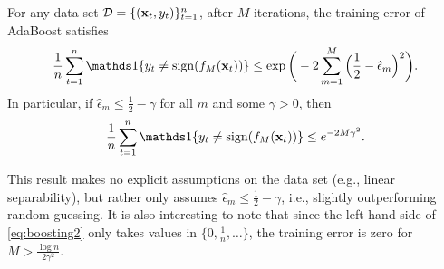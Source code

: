 \documentclass[english]{article}
\begin{document}
\begin{thm} \label{thm:main}
    For any data set $\mathcal{D} = \{(\mathbf{x}_t,y_t)\}_{t=1}^n$, after $M$ iterations, the training error of AdaBoost satisfies
    \begin{equation}
        \frac{1}{n}\sum_{t=1}^n \openone\{ y_t \ne \sign(f_M(\xv_t)) \} \le \exp\bigg( -2\sum_{m=1}^M \Big(\frac{1}{2}-\hat{\epsilon}_m\Big)^2 \bigg). \label{eq:main_result}
    \end{equation}
    In particular, if $\hat{\epsilon}_m \le \frac{1}{2} - \gamma$ for all $m$ and some $\gamma > 0$, then
    \begin{equation}
        \frac{1}{n}\sum_{t=1}^n \openone\{ y_t \ne \sign(f_M(\xv_t)) \}  \le e^{-2M\gamma^2}. \label{eq:boosting2}
    \end{equation}
\end{thm}
This result makes no explicit assumptions on the data set (e.g., linear separability), but rather only assumes $\hat{\epsilon}_m \le \frac{1}{2} - \gamma$, i.e., slightly outperforming random guessing.  It is also interesting to note that since the left-hand side of \eqref{eq:boosting2} only takes values in $\big\{0,\frac{1}{n},\dotsc\big\}$, the training error is zero for $M > \frac{\log n}{2\gamma^2}$.
\end{document}
